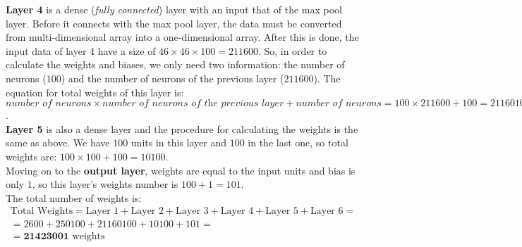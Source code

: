 \textbf{Layer 4} is a dense (\textit{fully connected}) layer with an input that of the max pool layer. Before it connects with the max pool layer, the data must be converted from multi-dimensional array into a one-dimensional array.
After this is done, the input data of layer 4 have a size of $46 \times 46 \times 100 = \num{211600}$. So, in order to calculate the weights and biases, we only need two information: the number of neurons ($100$) and the number of neurons of the previous layer ($\num{211600}$).
The equation for total weights of this layer is: $\textit{number of neurons} \times \textit{number of neurons of the previous layer} + \textit{number of neurons} = 100 \times 211600 + 100 = 21160100$. \\ 

\textbf{Layer 5} is also a dense layer and the procedure for calculating the weights is the same as above. 
We have $100$ units in this layer and $100$ in the last one, so total weights are: $100 \times 100 + 100 = \num{10100}$. \\

Moving on to the \textbf{output layer}, weights are equal to the input units and bias is only $1$, so this layer's weights number is $100 +1 = 101$. \\ 

The total number of weights is:
\[
\begin{gathered}
\text{Total Weights} = \text{Layer 1} + \text{Layer 2} + \text{Layer 3} + \text{Layer 4} + \text{Layer 5} + \text{Layer 6} = \\
= \num{2600} + \num{250100} + \num{21160100} + \num{10100} + \num{101} = \\  =\mathbf{\num{21423001}} \text{ weights}
\end{gathered}
\]